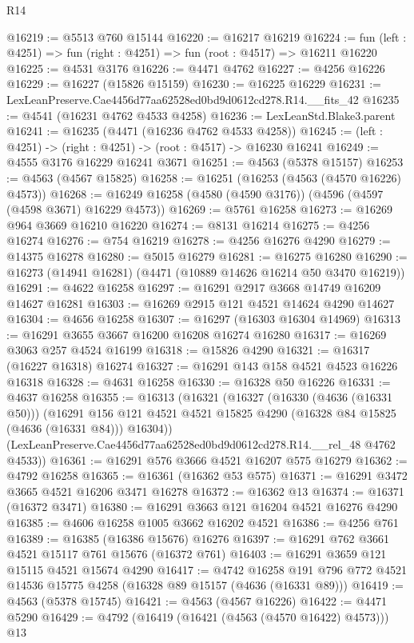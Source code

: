 \begin{lexlean}{R14}
\begin{coremodule}
@16219 := @5513 @760 @15144
@16220 := @16217 @16219
@16224 := fun (left : @4251) => fun (right : @4251) => fun (root : @4517) => @16211 @16220
@16225 := @4531 @3176
@16226 := @4471 @4762
@16227 := @4256 @16226
@16229 := @16227 (@15826 @15159)
@16230 := @16225 @16229
@16231 := LexLeanPreserve.Cae4456d77aa62528ed0bd9d0612cd278.R14.__fits_42
@16235 := @4541 (@16231 @4762 @4533 @4258)
@16236 := LexLeanStd.Blake3.parent
@16241 := @16235 (@4471 (@16236 @4762 @4533 @4258))
@16245 := (left : @4251) -> (right : @4251) -> (root : @4517) -> @16230 @16241
@16249 := @4555 @3176 @16229 @16241 @3671
@16251 := @4563 (@5378 @15157)
@16253 := @4563 (@4567 @15825)
@16258 := @16251 (@16253 (@4563 (@4570 @16226) @4573))
@16268 := @16249 @16258 (@4580 (@4590 @3176)) (@4596 (@4597 (@4598 @3671) @16229 @4573))
@16269 := @5761 @16258
@16273 := @16269 @964 @3669 @16210 @16220
@16274 := @8131 @16214
@16275 := @4256 @16274
@16276 := @754 @16219
@16278 := @4256 @16276 @4290
@16279 := @14375 @16278
@16280 := @5015 @16279
@16281 := @16275 @16280
@16290 := @16273 (@14941 @16281) (@4471 (@10889 @14626 @16214 @50 @3470 @16219))
@16291 := @4622 @16258
@16297 := @16291 @2917 @3668 @14749 @16209 @14627 @16281
@16303 := @16269 @2915 @121 @4521 @14624 @4290 @14627
@16304 := @4656 @16258
@16307 := @16297 (@16303 @16304 @14969)
@16313 := @16291 @3655 @3667 @16200 @16208 @16274 @16280
@16317 := @16269 @3063 @257 @4524 @16199
@16318 := @15826 @4290
@16321 := @16317 (@16227 @16318) @16274
@16327 := @16291 @143 @158 @4521 @4523 @16226 @16318
@16328 := @4631 @16258
@16330 := @16328 @50 @16226
@16331 := @4637 @16258
@16355 := @16313
    (@16321
      (@16327
        (@16330 (@4636 (@16331 @50)))
        (@16291 @156 @121 @4521 @4521 @15825 @4290 (@16328 @84 @15825 (@4636 (@16331 @84))) @16304))
      (LexLeanPreserve.Cae4456d77aa62528ed0bd9d0612cd278.R14.__rel_48 @4762 @4533))
@16361 := @16291 @576 @3666 @4521 @16207 @575 @16279
@16362 := @4792 @16258
@16365 := @16361 (@16362 @53 @575)
@16371 := @16291 @3472 @3665 @4521 @16206 @3471 @16278
@16372 := @16362 @13
@16374 := @16371 (@16372 @3471)
@16380 := @16291 @3663 @121 @16204 @4521 @16276 @4290
@16385 := @4606 @16258 @1005 @3662 @16202 @4521
@16386 := @4256 @761
@16389 := @16385 (@16386 @15676) @16276
@16397 := @16291 @762 @3661 @4521 @15117 @761 @15676 (@16372 @761)
@16403 := @16291 @3659 @121 @15115 @4521 @15674 @4290
@16417 := @4742
    @16258
    @191
    @796
    @772
    @4521
    @14536
    @15775
    @4258
    (@16328 @89 @15157 (@4636 (@16331 @89)))
@16419 := @4563 (@5378 @15745)
@16421 := @4563 (@4567 @16226)
@16422 := @4471 @5290
@16429 := @4792 (@16419 (@16421 (@4563 (@4570 @16422) @4573))) @13

\end{coremodule}
\end{lexlean}
